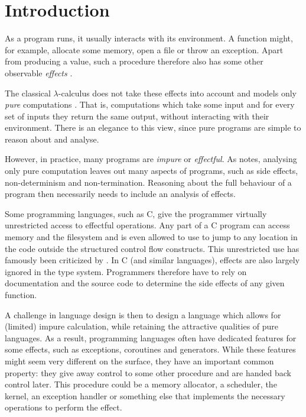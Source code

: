 \chapter{Introduction}\label{chap:introduction}

As a program runs, it usually interacts with its environment. A function might, for example, allocate some memory, open a file or throw an exception. Apart from producing a value, such a procedure therefore also has some other observable \emph{effects} \autocite{moggi_computational_1989}.

The classical $\lambda$-calculus does not take these effects into account and models only \emph{pure} computations \autocite{moggi_computational_1989}. That is, computations which take some input and for every set of inputs they return the same output, without interacting with their environment. There is an elegance to this view, since pure programs are simple to reason about and analyse.

However, in practice, many programs are \emph{impure} or \emph{effectful}. As \textcite{moggi_computational_1989} notes, analysing only pure computation leaves out many aspects of programs, such as side effects, non-determinism and non-termination. Reasoning about the full behaviour of a program then necessarily needs to include an analysis of effects.

Some programming languages, such as C, give the programmer virtually unrestricted access to effectful operations. Any part of a C program can access memory and the filesystem and is even allowed to use  to jump to any location in the code outside the structured control flow constructs. This unrestricted use has famously been criticized by \textcite{dijkstra_letters_1968}. In C (and similar languages), effects are also largely ignored in the type system. Programmers therefore have to rely on documentation and the source code to determine the side effects of any given function.

A challenge in language design is then to design a language which allows for (limited) impure calculation, while retaining the attractive qualities of pure languages. As a result, programming languages often have dedicated features for some effects, such as exceptions, coroutines and generators. While these features might seem very different on the surface, they have an important common property: they give away control to some other procedure and are handed back control later. This procedure could be a memory allocator, a scheduler, the kernel, an exception handler or something else that implements the necessary operations to perform the effect.

